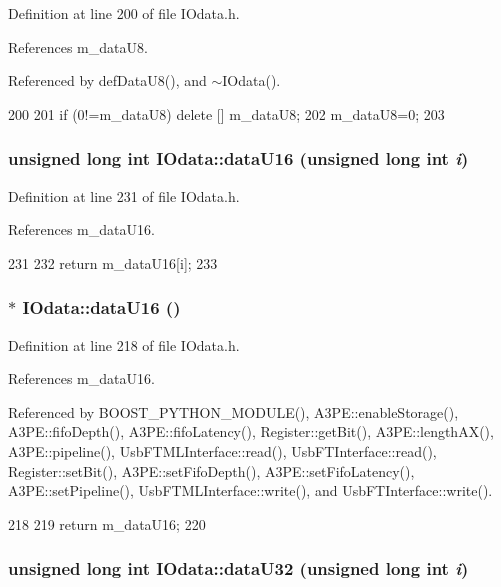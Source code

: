 Definition at line 200 of file IOdata.h.

References m\_\-dataU8.

Referenced by defDataU8(), and $\sim$IOdata().


\begin{DoxyCode}
200                     {
201     if (0!=m_dataU8) delete [] m_dataU8;
202     m_dataU8=0;
203   }
\end{DoxyCode}
\hypertarget{classIOdata_a32e3bb958cb6babcb928d403fea9f171}{
\subsubsection[{dataU16}]{\setlength{\rightskip}{0pt plus 5cm}unsigned long int IOdata::dataU16 (unsigned long int {\em i})}}
\label{classIOdata_a32e3bb958cb6babcb928d403fea9f171}


Definition at line 231 of file IOdata.h.

References m\_\-dataU16.


\begin{DoxyCode}
231                                                 {
232     return m_dataU16[i];
233   }
\end{DoxyCode}
\hypertarget{classIOdata_a8d8528b731c6cf117f8c5b9b2473390c}{
\subsubsection[{dataU16}]{$\ast$ IOdata::dataU16 ()}}
\label{classIOdata_a8d8528b731c6cf117f8c5b9b2473390c}


Definition at line 218 of file IOdata.h.

References m\_\-dataU16.

Referenced by BOOST\_\-PYTHON\_\-MODULE(), A3PE::enableStorage(), A3PE::fifoDepth(), A3PE::fifoLatency(), Register::getBit(), A3PE::lengthAX(), A3PE::pipeline(), UsbFTMLInterface::read(), UsbFTInterface::read(), Register::setBit(), A3PE::setFifoDepth(), A3PE::setFifoLatency(), A3PE::setPipeline(), UsbFTMLInterface::write(), and UsbFTInterface::write().


\begin{DoxyCode}
218                 {
219     return m_dataU16;
220   }
\end{DoxyCode}
\hypertarget{classIOdata_a4ce3bcd54206b1a2149e67cb45dee922}{
\subsubsection[{dataU32}]{\setlength{\rightskip}{0pt plus 5cm}unsigned long int IOdata::dataU32 (unsigned long int {\em i})}}
\label{classIOdata_a4ce3bcd54206b1a2149e67cb45dee922}


